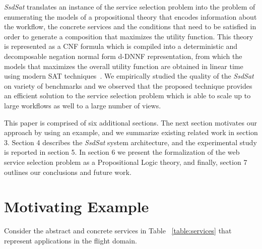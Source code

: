 \documentclass{llncs}
\begin{document}
{\it SsdSat}  translates an instance of the service selection problem into the problem of enumerating the models of a propositional theory that encodes information about the workflow, the concrete services and the conditions that need to be satisfied in order to generate a composition that maximizes the utility function. This theory is represented as a CNF formula which is compiled into a deterministic
and decomposable negation normal form d-DNNF representation, from which the models that maximizes the overall utility function are obtained in linear time using modern SAT techniques~\cite{darwiche:dnnf}.   
We empirically studied the quality of the {\it SsdSat} on variety of benchmarks and we observed  that the proposed technique provides an efficient solution to the service selection problem which is able to scale up to large workflows as well to a large number of views.   

 This paper is comprised of six additional sections. The next section motivates our approach by using an example, and  we summarize existing related work in section 3. Section 4 describes the {\it SsdSat} system architecture, and  the experimental study is reported in section 5. 
 In section 6 we present the formalization of the web service selection problem as a Propositional Logic theory, and finally, section 7 outlines our conclusions and future work.


\section{Motivating Example}
Consider the abstract and concrete services in Table ~\ref{table:services}  that represent applications in the flight domain.
\end{document}
